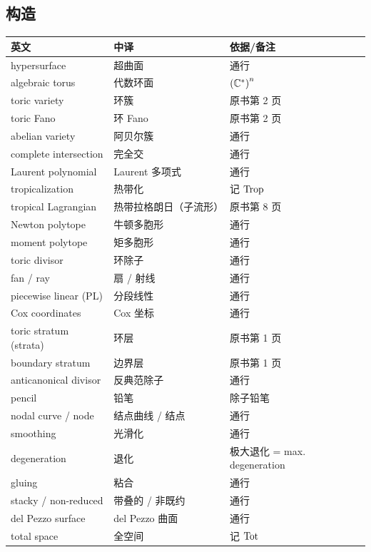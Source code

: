 \subsection*{构造}
\begin{longtable}{p{}p{}p{}}
\toprule
英文 & 中译 & 依据/备注\\
\midrule
\endhead
hypersurface & 超曲面 & 通行\\
algebraic torus & 代数环面 & $\left(\mathbb{C}^*\right)^n$\\
toric variety & 环簇 & 原书第 2 页\\
toric Fano & 环 Fano & 原书第 2 页\\
abelian variety & 阿贝尔簇 & 通行\\
complete intersection & 完全交 & 通行\\
Laurent polynomial & Laurent 多项式 & 通行\\
tropicalization & 热带化 & 记 $\operatorname{Trop}$\\
tropical Lagrangian & 热带拉格朗日（子流形） & 原书第 8 页\\
Newton polytope & 牛顿多胞形 & 通行\\
moment polytope & 矩多胞形 & 通行\\
toric divisor & 环除子 & 通行\\
fan / ray & 扇 / 射线 & 通行\\
piecewise linear (PL) & 分段线性 & 通行\\
Cox coordinates & Cox 坐标 & 通行\\
toric stratum (strata) & 环层 & 原书第 1 页\\
boundary stratum & 边界层 & 原书第 1 页\\
anticanonical divisor & 反典范除子 & 通行\\
pencil & 铅笔 & 除子铅笔\\
nodal curve / node & 结点曲线 / 结点 & 通行\\
smoothing & 光滑化 & 通行\\
degeneration & 退化 & 极大退化 = max. degeneration\\
gluing & 粘合 & 通行\\
stacky / non-reduced & 带叠的 / 非既约 & 通行\\
del Pezzo surface & del Pezzo 曲面 & 通行\\
total space & 全空间 & 记 $\operatorname{Tot}$\\
\bottomrule
\end{longtable}

